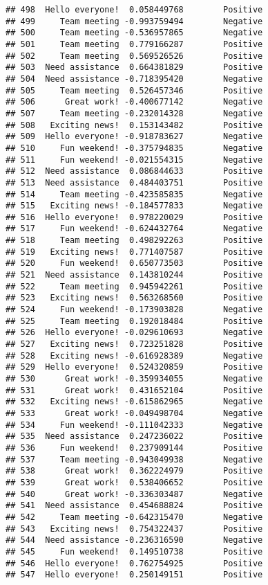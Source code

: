 \documentclass[
]{article}
\begin{document}
\begin{verbatim}
## 498  Hello everyone!  0.058449768        Positive
## 499     Team meeting -0.993759494        Negative
## 500     Team meeting -0.536957865        Negative
## 501     Team meeting  0.779166287        Positive
## 502     Team meeting  0.569526526        Positive
## 503  Need assistance  0.664381829        Positive
## 504  Need assistance -0.718395420        Negative
## 505     Team meeting  0.526457346        Positive
## 506      Great work! -0.400677142        Negative
## 507     Team meeting -0.232014328        Negative
## 508   Exciting news!  0.153143482        Positive
## 509  Hello everyone! -0.918783627        Negative
## 510     Fun weekend! -0.375794835        Negative
## 511     Fun weekend! -0.021554315        Negative
## 512  Need assistance  0.086844633        Positive
## 513  Need assistance  0.484403751        Positive
## 514     Team meeting -0.423585835        Negative
## 515   Exciting news! -0.184577833        Negative
## 516  Hello everyone!  0.978220029        Positive
## 517     Fun weekend! -0.624432764        Negative
## 518     Team meeting  0.498292263        Positive
## 519   Exciting news!  0.771407587        Positive
## 520     Fun weekend!  0.650773503        Positive
## 521  Need assistance  0.143810244        Positive
## 522     Team meeting  0.945942261        Positive
## 523   Exciting news!  0.563268560        Positive
## 524     Fun weekend! -0.173903828        Negative
## 525     Team meeting  0.192018484        Positive
## 526  Hello everyone! -0.029610693        Negative
## 527   Exciting news!  0.723251828        Positive
## 528   Exciting news! -0.616928389        Negative
## 529  Hello everyone!  0.524320859        Positive
## 530      Great work! -0.359934055        Negative
## 531      Great work!  0.431652104        Positive
## 532   Exciting news! -0.615862965        Negative
## 533      Great work! -0.049498704        Negative
## 534     Fun weekend! -0.111042333        Negative
## 535  Need assistance  0.247236022        Positive
## 536     Fun weekend!  0.237909144        Positive
## 537     Team meeting -0.943049938        Negative
## 538      Great work!  0.362224979        Positive
## 539      Great work!  0.538406652        Positive
## 540      Great work! -0.336303487        Negative
## 541  Need assistance  0.454688824        Positive
## 542     Team meeting -0.642315470        Negative
## 543   Exciting news!  0.754322437        Positive
## 544  Need assistance -0.236316590        Negative
## 545     Fun weekend!  0.149510738        Positive
## 546  Hello everyone!  0.762754925        Positive
## 547  Hello everyone!  0.250149151        Positive

\end{verbatim}
\end{document}
